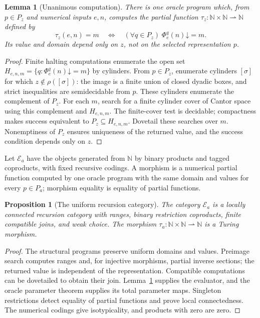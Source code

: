 \documentclass[11pt]{article}
\newtheorem{lemma}[theorem]{Lemma}
\newtheorem{proposition}[theorem]{Proposition}
\theoremstyle{definition}\newtheorem{definition}[theorem]{Definition}
\newcommand{\N}{\mathbb N}
\newcommand{\E}{\mathcal E}
\begin{document}
\begin{lemma}[Unanimous computation]\label{lem:miller-unanimity}
There is one oracle program which, from $p\in P_z$ and numerical
inputs $e,n$, computes the partial function
$\tau_z:\N\times\N\rightharpoonup\N$ defined by
\[
 \tau_z(e,n)=m\quad\Longleftrightarrow\quad
 (\forall q\in P_z)\;\Phi_e^q(n)\mathord\downarrow=m.
\]
Its value and domain depend only on $z$, not on the selected
representation $p$.
\end{lemma}
\begin{proof}
Finite halting computations enumerate the open set
$H_{e,n,m}=\{q:\Phi_e^q(n)\mathord\downarrow=m\}$ by cylinders.
From $p\in P_z$, enumerate cylinders $[\sigma]$ for which
$z\notin\rho([\sigma])$: the image is a finite union of closed
dyadic boxes, and strict inequalities are semidecidable from $p$.
These cylinders enumerate the complement of $P_z$. For each $m$,
search for a finite cylinder cover of Cantor space using this
complement and $H_{e,n,m}$. The finite-cover test is decidable;
compactness makes success equivalent to $P_z\subseteq H_{e,n,m}$.
Dovetail these searches over $m$. Nonemptiness of $P_z$ ensures
uniqueness of the returned value, and the success condition depends
only on $z$.
\end{proof}

Let $\E_a$ have the objects generated from $\N$ by binary
products and tagged coproducts, with fixed recursive codings.
A morphism is a numerical partial function computed by one oracle
program with the same domain and values for every $p\in P_a$;
morphism equality is equality of partial functions.

\begin{proposition}[The uniform recursion category]\label{prop:miller-category}
The category $\E_a$ is a locally connected recursion category with
ranges, binary restriction coproducts, finite compatible joins,
and weak choice. The morphism
$\tau_a:\N\times\N\rightharpoonup\N$ is a Turing morphism.
\end{proposition}
\begin{proof}
The structural programs preserve uniform domains and values.
Preimage search computes ranges and, for injective morphisms,
partial inverse sections; the returned value is independent of
the representation. Compatible computations can be dovetailed
to obtain their join. Lemma~\ref{lem:miller-unanimity} supplies
the evaluator, and the oracle parameter theorem supplies its total
parameter maps. Singleton restrictions detect equality of partial
functions and prove local connectedness. The numerical codings
give isotypicality, and products with zero are zero.
\end{proof}
\end{document}
